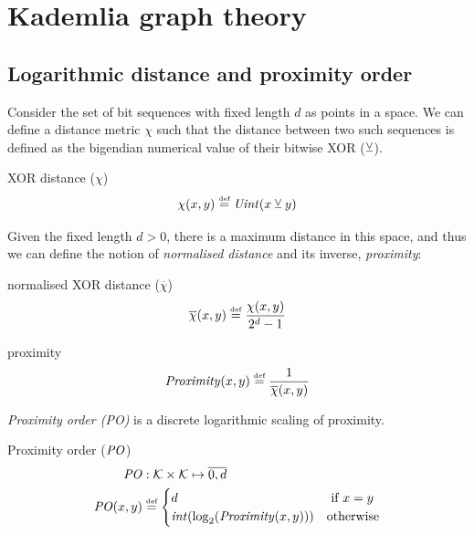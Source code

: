 
\chapter{Kademlia graph theory}
\section{Logarithmic distance and proximity order}\label{sec:proximity}
Consider the set of bit sequences with fixed length $d$ as points in a space. We can define a distance metric $\chi$ such that
the distance between two such sequences is defined as the bigendian numerical value of their bitwise XOR ($\veebar$).

\begin{definition}{XOR distance ($\chi$)}\label{def:xor}
\begin{equation}
\chi(x, y) \overset{\textrm{\tiny def}}{=} \mathit{Uint}(x  \veebar y)
\end{equation}
\end{definition}

Given the fixed length $d>0$, there is a maximum distance in this space, and thus we can define the notion of \emph{normalised distance} and its inverse, \emph{proximity}:

\begin{definition}{normalised XOR distance ($\overline{\chi}$)}\label{def:normalisedxor}
\begin{equation}
\overline{\chi}(x, y) \overset{\textrm{\tiny def}}{=} \frac{\chi(x,y)}{2^d-1}
\end{equation}
\end{definition}

\begin{definition}{proximity}\label{def:proximity}
\begin{equation}
\mathit{Proximity}(x, y) \overset{\textrm{\tiny def}}{=} \frac{1}{\overline{\chi}(x,y)}
\end{equation}{}
\end{definition}


\emph{Proximity order (PO)} is a discrete logarithmic scaling of proximity.


\begin{definition}{Proximity order ($\mathit{PO}$)}\label{def:xorPO}
\begin{equation}
\begin{split}
\mathit{PO}&: \mathcal{K} \times\mathcal{K}\mapsto \overline{0,d}\\
\mathit{PO}(x,y) &\overset{\textrm{\tiny def}}{=} 
\begin{cases}
d & \text{ if } x=y\\
\mathit{int}(\log_2(\mathit{Proximity}(x, y)))&\text{otherwise}\\
\end{cases}
\end{split}
\end{equation}
\end{definition}


